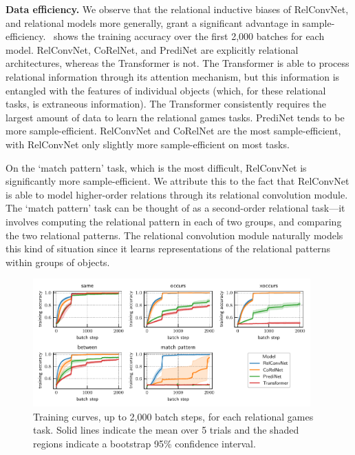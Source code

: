 \textbf{Data efficiency.} We observe that the relational inductive biases of RelConvNet, and relational models more generally, grant a significant advantage in sample-efficiency.~ shows the training accuracy over the first 2,000 batches for each model. RelConvNet, CoRelNet, and PrediNet are explicitly relational architectures, whereas the Transformer is not. The Transformer is able to process relational information through its attention mechanism, but this information is entangled with the features of individual objects (which, for these relational tasks, is extraneous information). The Transformer consistently requires the largest amount of data to learn the relational games tasks. PrediNet tends to be more sample-efficient. RelConvNet and CoRelNet are the most sample-efficient, with RelConvNet only slightly more sample-efficient on most tasks.

On the `match pattern' task, which is the most difficult, RelConvNet is significantly more sample-efficient. We attribute this to the fact that RelConvNet is able to model higher-order relations through its relational convolution module. The `match pattern' task can be thought of as a second-order relational task---it involves computing the relational pattern in each of two groups, and comparing the two relational patterns. The relational convolution module naturally models this kind of situation since it learns representations of the relational patterns within groups of objects. %

\begin{figure}[t]
    \centering
    \includegraphics[width=0.95\textwidth]{figs/experiments/all_training_curves.pdf}
    \caption{Training curves, up to 2,000 batch steps, for each relational games task. Solid lines indicate the mean over 5 trials and the shaded regions indicate a bootstrap 95\% confidence interval.}\label{fig:training_curves}
\end{figure}

